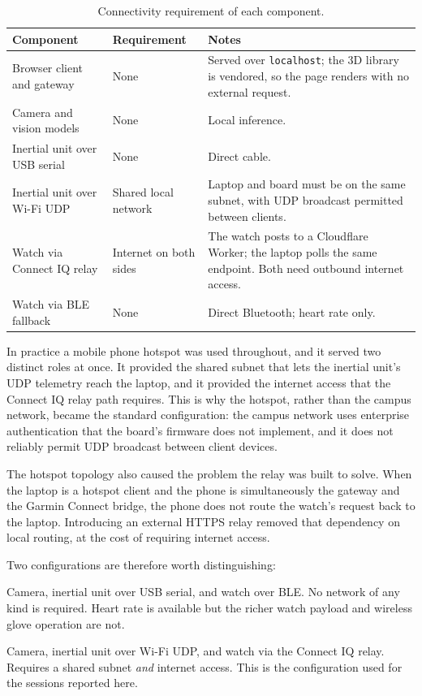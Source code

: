 \documentclass[11pt,a4paper]{article}
\newcommand{\code}[1]{\texttt{\small #1}}
\begin{document}
\begin{table}[H]
\centering
\small
\caption{Connectivity requirement of each component.}
\label{tab:network}
\begin{tabularx}{\textwidth}{@{}L{4.6cm} L{4.0cm} Y@{}}
\toprule
\textbf{Component} & \textbf{Requirement} & \textbf{Notes} \\
\midrule
Browser client and gateway & None & Served over \code{localhost}; the 3D library is vendored, so the page renders with no external request. \\
Camera and vision models & None & Local inference. \\
Inertial unit over USB serial & None & Direct cable. \\
Inertial unit over Wi-Fi UDP & Shared local network & Laptop and board must be on the same subnet, with UDP broadcast permitted between clients. \\
Watch via Connect IQ relay & Internet on both sides & The watch posts to a Cloudflare Worker; the laptop polls the same endpoint. Both need outbound internet access. \\
Watch via BLE fallback & None & Direct Bluetooth; heart rate only. \\
\bottomrule
\end{tabularx}
\end{table}

In practice a mobile phone hotspot was used throughout, and it served two
distinct roles at once. It provided the shared subnet that lets the inertial
unit's UDP telemetry reach the laptop, and it provided the internet access that
the Connect IQ relay path requires. This is why the hotspot, rather than the
campus network, became the standard configuration: the campus network uses
enterprise authentication that the board's firmware does not implement, and it
does not reliably permit UDP broadcast between client devices.

The hotspot topology also caused the problem the relay was built to solve. When
the laptop is a hotspot client and the phone is simultaneously the gateway and
the Garmin Connect bridge, the phone does not route the watch's request back to
the laptop. Introducing an external HTTPS relay removed that dependency on
local routing, at the cost of requiring internet access.

Two configurations are therefore worth distinguishing:

\begin{description}[leftmargin=1.2cm,style=nextline,itemsep=3pt]
\item[Fully offline configuration] Camera, inertial unit over USB serial, and
watch over BLE. No network of any kind is required. Heart rate is available but
the richer watch payload and wireless glove operation are not.
\item[Demonstrated configuration] Camera, inertial unit over Wi-Fi UDP, and
watch via the Connect IQ relay. Requires a shared subnet \emph{and} internet
access. This is the configuration used for the sessions reported here.
\end{description}
\end{document}
